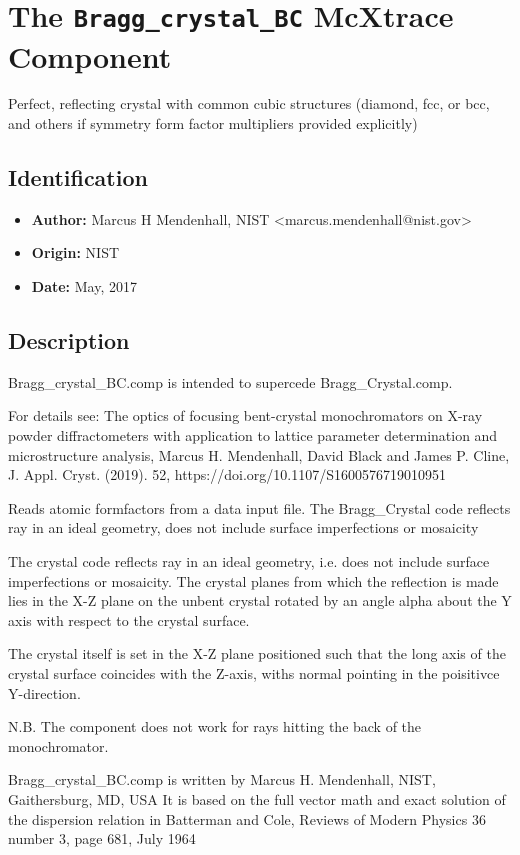 \section{The \texttt{Bragg\_crystal\_BC} McXtrace Component}
Perfect, reflecting crystal with common cubic structures (diamond, fcc, or bcc, and others if symmetry form factor multipliers provided explicitly)

\subsection*{Identification}
\begin{itemize}
  \item \textbf{Author:} Marcus H Mendenhall, NIST \textless{}marcus.mendenhall@nist.gov\textgreater{}
  \item \textbf{Origin:} NIST
  \item \textbf{Date:} May, 2017
\end{itemize}

\subsection*{Description}
Bragg\_crystal\_BC.comp is intended to supercede Bragg\_Crystal.comp.

For details see: The optics of focusing bent-crystal monochromators on X-ray powder diffractometers with application to lattice parameter determination and microstructure analysis, Marcus H. Mendenhall, David Black and James P. Cline, J. Appl. Cryst. (2019). 52, https://doi.org/10.1107/S1600576719010951

Reads atomic formfactors from a data input file. The Bragg\_Crystal code reflects ray in an ideal geometry, does not include surface imperfections or mosaicity

The crystal code reflects ray in an ideal geometry, i.e. does not include surface imperfections or mosaicity. The crystal planes from which the reflection is made lies in the X-Z plane on the unbent crystal rotated by an angle alpha about the Y axis with respect to the crystal surface.

The crystal itself is set in the X-Z plane positioned such that the long axis of the crystal surface coincides with the Z-axis, withs normal pointing in the poisitivce Y-direction.

N.B. The component does not work for rays hitting the back of the monochromator.

Bragg\_crystal\_BC.comp is written by Marcus H. Mendenhall, NIST, Gaithersburg, MD, USA It is based on the full vector math and exact solution of the dispersion relation in Batterman and Cole, Reviews of Modern Physics 36 number 3, page 681, July 1964


